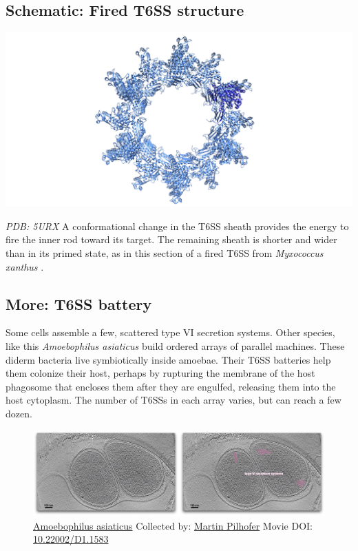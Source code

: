 \documentclass[]{tufte-book}
\begin{document}
\hypertarget{Fired_T6SS_structure}{\subsection*{Schematic: Fired T6SS
structure}\label{Fired_T6SS_structure}}

\includegraphics{img/schematics/9_7_1}

\emph{PDB: 5URX} A conformational change in the T6SS sheath provides the
energy to fire the inner rod toward its target. The remaining sheath is
shorter and wider than in its primed state, as in this section of a
fired T6SS from \emph{Myxococcus xanthus} \citep{chang2017}.

\hypertarget{T6SS_battery}{\subsection*{More: T6SS
battery}\label{T6SS_battery}}

Some cells assemble a few, scattered type VI secretion systems. Other
species, like this \emph{Amoebophilus asiaticus} build ordered arrays of
parallel machines. These diderm bacteria live symbiotically inside
amoebae. Their T6SS batteries help them colonize their host, perhaps by
rupturing the membrane of the host phagosome that encloses them after
they are engulfed, releasing them into the host cytoplasm. The number of
T6SSs in each array varies, but can reach a few dozen.





\begin{figure}
\includegraphics{movie_stills/9_7a} \caption[\protect\hyperlink{tree}{Amoebophilus asiaticus} Collected
by: \protect\hyperlink{martin_pilhofer}{Martin Pilhofer} Movie DOI:
\href{https://doi.org/10.22002/D1.1583}{10.22002/D1.1583}]{\protect\hyperlink{tree}{Amoebophilus asiaticus} Collected
by: \protect\hyperlink{martin_pilhofer}{Martin Pilhofer} Movie DOI:
\href{https://doi.org/10.22002/D1.1583}{10.22002/D1.1583}}\label{fig:9-7a}
\end{figure}
\end{document}
